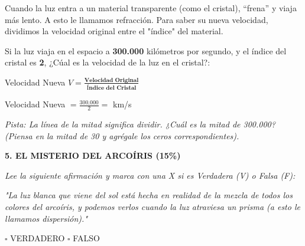 \documentclass[12pt, letterpaper]{article}
\newcommand{\boxfill}[1][1.5cm]{\tcbox[on line, size=minimal, colframe=valdark!80, colback=white, boxrule=0.5pt, arc=1mm, boxsep=3pt, left=2pt, right=2pt, top=2pt, bottom=2pt]{\hspace*{#1}\vphantom{M}}}
\begin{document}
\vspace{0.2cm}
\noindent Cuando la luz entra a un material transparente (como el cristal), ``frena'' y viaja más lento. A esto le llamamos refracción. Para saber su nueva velocidad, dividimos la velocidad original entre el "índice" del material.

\vspace{0.2cm}
\noindent Si la luz viaja en el espacio a \textbf{300.000} kilómetros por segundo, y el índice del cristal es \textbf{2}, ¿Cúal es la velocidad de la luz en el cristal?:

\vspace{0.4cm}
\begin{center}
    \quad Velocidad Nueva $V= \frac{\textbf{Velocidad Original}}{\textbf{Índice del Cristal}}$
\end{center}

\vspace{0.4cm}
\begin{center}
    
    \Large 
    Velocidad Nueva $= \frac{300.000}{2} =$ \boxfill[3cm] km/s
\end{center}

\vspace{0.3cm}
\begin{center}
    \normalsize \textit{Pista: La línea de la mitad significa dividir. ¿Cuál es la mitad de 300.000?\\ (Piensa en la mitad de 30 y agrégale los ceros correspondientes).}
\end{center}

\vspace{0.8cm}
\noindent \textbf{\textcolor{valblue}{5. EL MISTERIO DEL ARCOÍRIS (15\%)}}

\vspace{0.2cm}
\noindent \textit{Lee la siguiente afirmación y marca con una X si es Verdadera (V) o Falsa (F):}

\vspace{0.3cm}
\begin{center}
    \begin{tcolorbox}[colback=white, colframe=valdark, boxrule=0.5pt, width=13cm, arc=2mm]
        \textit{"La luz blanca que viene del sol está hecha en realidad de la mezcla de todos los colores del arcoíris, y podemos verlos cuando la luz atraviesa un prisma (a esto le llamamos dispersión)."}
    \end{tcolorbox}
\end{center}

\vspace{0.4cm}
\begin{center}
    \Large
    $\square$ VERDADERO \hspace{3cm} $\square$ FALSO
\end{center}
\end{document}

